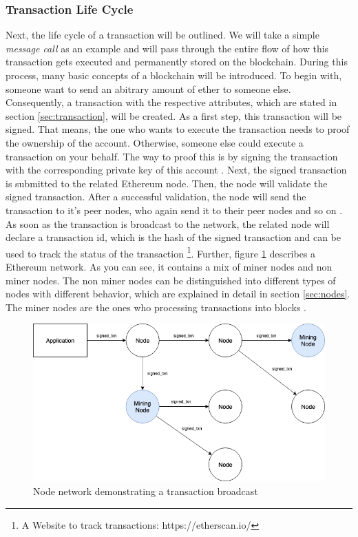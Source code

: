 \subsubsection{Transaction Life Cycle}
\label{sec:transaction_lifecycle}
Next, the life cycle of a transaction will be outlined. We will take a simple \textit{message call} as an example and will pass through the entire flow of how this transaction gets executed and permanently stored on the blockchain. During this process, many basic concepts of a blockchain will be introduced. 
To begin with, someone want to send an abitrary amount of ether to someone else. Consequently, a transaction with the respective attributes, which are stated in section \ref{sec:transaction}, will be created. As a first step, this transaction will be signed. That means, the one who wants to execute the transaction needs to proof the ownership of the account. Otherwise, someone else could execute a transaction on your behalf. The way to proof this is by signing the transaction with the corresponding private key of this account \cite{transaction_life_cycle}. 
Next, the signed transaction is submitted to the related Ethereum node. Then, the node will validate the signed transaction. After a successful validation, the node will send the transaction to it's peer nodes, who again send it to their peer nodes and so on \cite{transaction_life_cycle}. As soon as the transaction is broadcast to the network, the related node will declare a transaction id, which is the hash of the signed transaction and can be used to track the status of the transaction \footnote{A Website to track transactions: https://etherscan.io/}. Further, figure \ref{figure:node_network} describes a Ethereum network. As you can see, it contains a mix of miner nodes and non miner nodes. The non miner nodes can be distinguished into different types of nodes with different behavior, which are explained in detail in section \ref{sec:nodes}. The miner nodes are the ones who processing transactions into blocks \cite{transaction_life_cycle}. 

\begin{figure}[htbp]
	\centering
	\includegraphics[width=.9\linewidth]{./figures/node_network.png}
	\caption{Node network demonstrating a transaction broadcast}
	\label{figure:node_network}
\end{figure}

